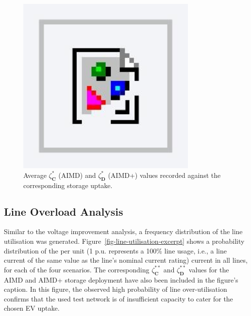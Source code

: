 \begin{figure}\centering
 \includegraphics[width=0.8\textwidth]{foo}
 \caption{Average $\zeta_\textbf{C}^{*}$ (AIMD) and $\zeta_\textbf{D}^{*}$ (AIMD+) values recorded against the corresponding storage uptake.}
 \label{fig-voltage-AIMD-compare}
\end{figure}

\subsection{Line Overload Analysis}

Similar to the voltage improvement analysis, a frequency distribution of the line utilisation was generated. Figure~\ref{fig-line-utilisation-excerpt} shows a probability distribution of the per unit (1 p.u. represents a 100\% line usage, i.e., a line current of the same value as the line's nominal current rating) current in all lines, for each of the four scenarios. The corresponding $\zeta_\textbf{C}^{**}$ and $\zeta_\textbf{D}^{**}$ values for the AIMD and AIMD+ storage deployment have also been included in the figure's caption. In this figure, the observed high probability of line over-utilisation confirms that the used test network is of insufficient capacity to cater for the chosen EV uptake.

